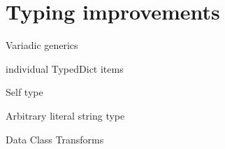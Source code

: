 \documentclass[aspectratio=169, xetex, 12pt]{beamer}
\begin{document}
    \section{Typing improvements}

    \begin{frame}{Variadic generics}
    \end{frame}

    \begin{frame}{individual TypedDict items}
    \end{frame}

    \begin{frame}{Self type}
    \end{frame}

    \begin{frame}{Arbitrary literal string type}
    \end{frame}

    \begin{frame}{Data Class Transforms}
    \end{frame}
\end{document}
